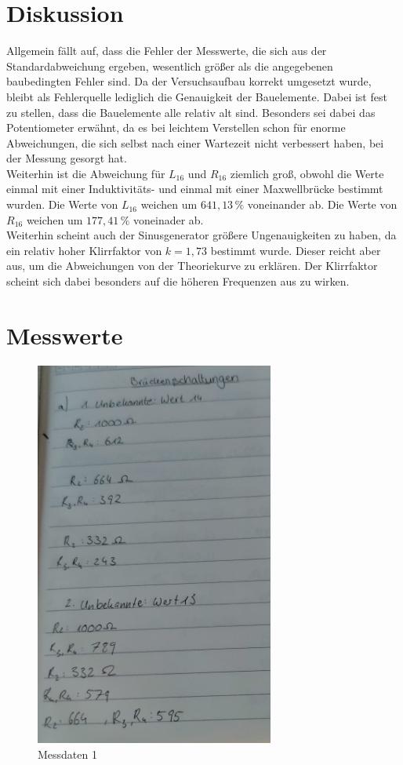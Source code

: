 \section{Diskussion}
\label{sec:Diskussion}
Allgemein fällt auf, dass die Fehler der Messwerte, die sich aus der Standardabweichung ergeben, wesentlich größer
als die angegebenen baubedingten Fehler sind. Da der Versuchsaufbau korrekt umgesetzt wurde, bleibt als Fehlerquelle
lediglich die Genauigkeit der Bauelemente. Dabei ist fest zu stellen, dass die Bauelemente alle relativ alt sind. 
Besonders sei dabei das Potentiometer erwähnt, da es bei leichtem Verstellen schon für enorme Abweichungen, die sich selbst
nach einer Wartezeit nicht verbessert haben, bei der Messung gesorgt hat.\\
Weiterhin ist die Abweichung für $L_{16}$ und $R_{16}$ ziemlich groß, obwohl die Werte einmal mit einer 
Induktivitäts- und einmal mit einer Maxwellbrücke bestimmt wurden. Die Werte von $L_{16}$ weichen um $641,13\,\%$
voneinander ab. Die Werte von $R_{16}$ weichen um $177,41\,\%$ voneinader ab.\\
Weiterhin scheint auch der Sinusgenerator größere Ungenauigkeiten zu haben, da ein relativ hoher Klirrfaktor von 
$k=1,73$ bestimmt wurde. Dieser reicht aber aus, um die Abweichungen von der Theoriekurve zu erklären. Der Klirrfaktor
scheint sich dabei besonders auf die höheren Frequenzen aus zu wirken.


\section{Messwerte}
\label{sec:Messwerte}

\begin{figure}
  \centering
  \includegraphics[width=0.7\textwidth]{M_a).jpeg}
  \caption{Messdaten 1}
  \label{fig:M1}
\end{figure}

